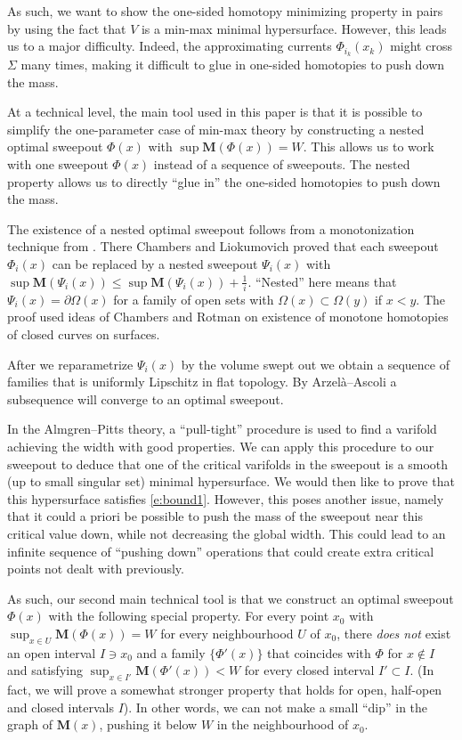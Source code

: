 \documentclass[12pt,twoside]{amsart}
\numberwithin{equation}{section}
\renewcommand{\leq}{\leqslant}
\newcommand{\Om}{\Omega}
\newcommand{\bM}{\mathbf{M}}
\begin{document}
As such, we want to show the one-sided homotopy minimizing property in pairs by using the fact that $V$ is a min-max minimal hypersurface. However, this leads us to a major difficulty. Indeed, the approximating currents $\Phi_{i_k}(x_k)$ might cross $\Sigma$ many times, making it difficult to glue in one-sided homotopies to push down the mass. 

At a technical level, the main tool used in this paper is that it is possible to 
 simplify the one-parameter case of min-max 
 theory by constructing a nested optimal sweepout $\Phi(x)$ with $\sup \bM(\Phi(x)) = W$.
This allows us to work with one
sweepout $\Phi(x)$
instead of a sequence of sweepouts. The nested property allows us to directly ``glue in'' the one-sided homotopies to push down the mass. 


The existence of a nested optimal
sweepout follows from a monotonization
technique from \cite{CL}.
There Chambers and Liokumovich proved that
each sweepout
$\Phi_i(x)$ can be replaced by a nested sweepout 
$\Psi_i(x)$ with $\sup \bM(\Psi_i(x)) \leq \sup
\bM(\Psi_i(x)) + \frac{1}{i}$. ``Nested'' here means 
that $\Psi_i(x) = \partial \Om(x)$ for a family of  open sets with $\Om(x) \subset \Om(y)$ if $x<y$. The proof
used ideas of Chambers and Rotman \cite{CR} on existence of monotone homotopies of closed curves on surfaces.

After we reparametrize $\Psi_i(x)$
by the volume swept out we obtain a sequence of families that is uniformly Lipschitz in flat topology. By Arzel\`a--Ascoli a subsequence will converge to an optimal sweepout.


In the Almgren--Pitts theory, a ``pull-tight'' procedure is used to find a varifold achieving the width with good properties. We can apply this procedure to our sweepout to deduce that one of the critical varifolds in the sweepout is a smooth (up to small singular set) minimal hypersurface. We would then like to prove that this hypersurface satisfies \eqref{e:bound1}. However, this poses another issue, namely that it could a priori be possible to push the mass of the sweepout near this critical value down, while not decreasing the global width. This could lead to an infinite sequence of ``pushing down'' operations that could create extra critical points not dealt with previously. 


As such, our second main technical tool is that we construct an 
optimal sweepout $\Phi(x)$ with the following special property. 
For every point $x_0$ 
with 
$\sup_{x\in U} \bM(\Phi(x)) = W$
for every neighbourhood $U$ of $x_0$, 
there \emph{does not} exist an open interval $I \ni x_0$
and a family 
$\{\Phi'(x)\}$ that coincides with $\Phi$ for $x\notin I$ and satisfying $\sup_{x \in I'} \bM(\Phi'(x)) < W$ for every closed interval $I' \subset I$.
(In fact, we will prove a somewhat stronger property
that holds for open, half-open and closed intervals $I$).
In other words, we can not make a
small ``dip'' in the graph of $\bM(x)$,
pushing it below $W$
in the neighbourhood of $x_0$.
\end{document}
